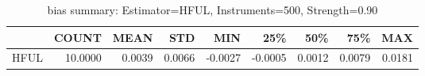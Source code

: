 \begin{table}[ht]
\centering
\caption{bias summary: Estimator=HFUL, Instruments=500, Strength=0.90}
\begin{tabular}{lrrrrrrrr}
\toprule
 & COUNT & MEAN & STD & MIN & 25\% & 50\% & 75\% & MAX \\
\midrule
HFUL & 10.0000 & 0.0039 & 0.0066 & -0.0027 & -0.0005 & 0.0012 & 0.0079 & 0.0181 \\
\bottomrule
\end{tabular}
\end{table}
